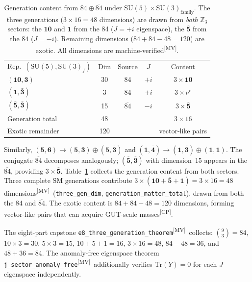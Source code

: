 \documentclass[aps,prl,twocolumn,showpacs,preprintnumbers,superscriptaddress,floatfix]{revtex4-2}
\newcommand{\Tr}{\mathrm{Tr}}
\newcommand{\MV}{\textsuperscript{[MV]}}
\newcommand{\CP}{\textsuperscript{[CP]}}
\begin{document}
\begin{table}[t]
\caption{Generation content from $84 \oplus \overline{84}$ under
$\mathrm{SU}(5) \times \mathrm{SU}(3)_\mathrm{family}$.
The three generations ($3 \times 16 = 48$ dimensions) are drawn from
\emph{both} $\mathbb{Z}_3$ sectors: the $\mathbf{10}$ and
$\mathbf{1}$ from the 84 ($J = +i$ eigenspace), the
$\overline{\mathbf{5}}$ from the $\overline{84}$ ($J = -i$).
Remaining dimensions ($84 + 84 - 48 = 120$) are exotic.
All dimensions are machine-verified\MV.}
\label{tab:84}
\begin{ruledtabular}
\begin{tabular}{lcccc}
Rep.\ $(\mathrm{SU}(5), \mathrm{SU}(3)_f)$ & Dim & Source & $J$ & Content \\
\colrule
$(\mathbf{10},\mathbf{3})$ & 30 & 84 & $+i$ & $3\times\mathbf{10}$ \\
$(\mathbf{1},\bar{\mathbf{3}})$ & 3  & 84 & $+i$ & $3\times\nu^c$ \\
$(\bar{\mathbf{5}},\bar{\mathbf{3}})$ & 15 & $\overline{84}$ & $-i$ & $3\times\bar{\mathbf{5}}$ \\
\colrule
Generation total & 48 & & & $3 \times 16$ \\
Exotic remainder & 120 & & & vector-like pairs \\
\end{tabular}
\end{ruledtabular}
\end{table}

Similarly, $(\mathbf{5},\mathbf{6}) \to (\mathbf{5},\mathbf{3})
\oplus (\mathbf{5},\overline{\mathbf{3}})$ and
$(\mathbf{1},\overline{\mathbf{4}}) \to
(\mathbf{1},\overline{\mathbf{3}}) \oplus (\mathbf{1},\mathbf{1})$.
The conjugate $\overline{84}$ decomposes analogously;
$(\overline{\mathbf{5}},\overline{\mathbf{3}})$ with dimension~15
appears in the $\overline{84}$, providing $3 \times \overline{\mathbf{5}}$.
Table~\ref{tab:84} collects the generation content from both sectors.
Three complete SM generations contribute
$3 \times (\mathbf{10} + \overline{\mathbf{5}} + \mathbf{1}) =
3 \times 16 = 48$ dimensions\MV\
(\texttt{three\_gen\_dim}, \texttt{generation\_matter\_total}),
drawn from both the 84 and $\overline{84}$.
The exotic content is $84 + 84 - 48 = 120$ dimensions,
forming vector-like pairs that can acquire GUT-scale masses\CP.

The eight-part capstone \texttt{e8\_three\_generation\_theorem}\MV\
collects: $\binom{9}{3} = 84$, $10 \times 3 = 30$,
$5 \times 3 = 15$, $10 + 5 + 1 = 16$, $3 \times 16 = 48$,
$84 - 48 = 36$, and $48 + 36 = 84$.
The anomaly-free eigenspace theorem
\texttt{j\_sector\_anomaly\_free}\MV\ additionally verifies
$\Tr(Y) = 0$ for each $J$ eigenspace independently.
\end{document}
